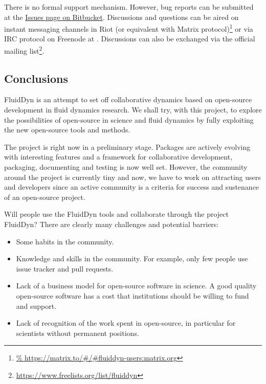 There is no formal support mechanism. However, bug reports can be submitted at the
\href{https://bitbucket.org/fluiddyn/fluiddyn/issues}{Issues page on Bitbucket}.
Discussions and questions can be aired on instant messaging channels in Riot (or
equivalent with Matrix protocol)\footnote{
\url{%
  https://matrix.to/\#/\#fluiddyn-users:matrix.org}}
or via IRC protocol on Freenode at . Discussions
can also be exchanged via the official mailing list\footnote{
\url{https://www.freelists.org/list/fluiddyn}}.

\subsection{Conclusions}

FluidDyn is an attempt to set off collaborative dynamics based on open-source
development in fluid dynamics research.
%
We shall try, with this project, to explore the possibilities of open-source in
science and fluid dynamics by fully exploiting the new open-source tools and
methods.

The project is right now in a preliminary stage.  Packages are actively evolving
with interesting features and a framework for collaborative development,
packaging, documenting and testing is now well set.
%
However, the community around the project is currently tiny and now, we have to
work on attracting users and developers since an active community is a
criteria for success and sustenance of an open-source project.

Will people use the FluidDyn tools and collaborate through the project
FluidDyn?
%
There are clearly many challenges and potential barriers:
\begin{itemize}
\item Some habits in the community.
\item Knowledge and skills in the community. For example, only few people use
issue tracker and pull requests.
\item Lack of a business model for open-source software in science.  A good
quality open-source software has a cost that institutions should be willing
to fund and support.
\item Lack of recognition of the work spent in open-source, in particular for
scientists without permanent positions.
\end{itemize}

